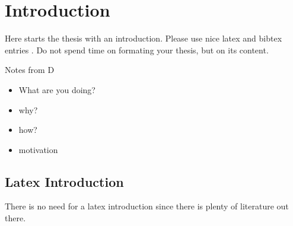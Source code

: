 \chapter{Introduction}
\label{chapter:Introduction}

Here starts the thesis with an introduction. Please use nice latex and bibtex entries \cite{latex}. Do not spend time on formating your thesis, but on its content. 

Notes from D
\begin{itemize}
 \item What are you doing?
 \item why?
 \item how?
 \item motivation
\end{itemize}

\section{Latex Introduction}
There is no need for a latex introduction since there is plenty of literature out there.
 


